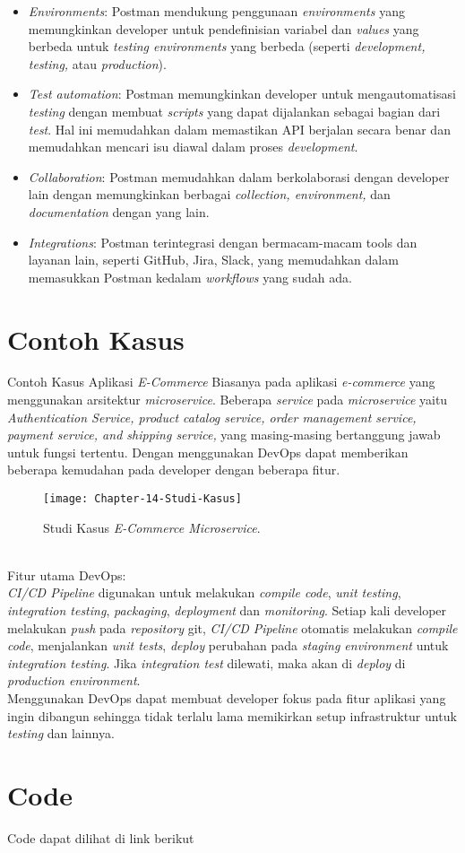 \begin{enumerate}
\begin{itemize}
		\item \textit{Environments}: Postman mendukung penggunaan \textit{environments} yang memungkinkan developer untuk pendefinisian variabel dan \textit{values} yang berbeda untuk \textit{testing environments} yang berbeda (seperti \textit{development, testing,} atau \textit{production}).
		
		\item \textit{Test automation}: Postman memungkinkan developer untuk mengautomatisasi \textit{testing} dengan membuat \textit{scripts} yang dapat dijalankan sebagai bagian dari \textit{test}. Hal ini memudahkan dalam memastikan API berjalan secara benar dan memudahkan mencari isu diawal dalam proses \textit{development}.
		
		\item \textit{Collaboration}: Postman memudahkan dalam berkolaborasi dengan developer lain dengan memungkinkan berbagai \textit{collection, environment,} dan \textit{documentation} dengan yang lain.
		
		\item \textit{Integrations}: Postman terintegrasi dengan bermacam-macam tools dan layanan lain, seperti GitHub, Jira, Slack, yang memudahkan dalam memasukkan Postman kedalam \textit{workflows} yang sudah ada.
	\end{itemize}
\end{enumerate}
\section{Contoh Kasus}
Contoh Kasus Aplikasi \textit{E-Commerce}
Biasanya pada aplikasi \textit{e-commerce} yang menggunakan arsitektur \textit{microservice}. Beberapa \textit{service} pada \textit{microservice} yaitu
\textit{Authentication Service, product catalog service, order management service, payment service, and shipping service,} yang masing-masing bertanggung jawab untuk fungsi tertentu.
Dengan menggunakan DevOps dapat memberikan beberapa kemudahan pada developer dengan beberapa fitur.
\begin{figure}[h]
	\centering
	\texttt{[image: Chapter-14-Studi-Kasus]}
	\caption{Studi Kasus \textit{E-Commerce Microservice}.}
	\label{fig:client-server-schema}
\end{figure}
\\Fitur utama DevOps:
	\\\textit{CI/CD Pipeline} digunakan untuk melakukan \textit{compile code}, \textit{unit testing}, \textit{integration testing}, \textit{packaging}, \textit{deployment} dan \textit{monitoring}.
	Setiap kali developer melakukan \textit{push} pada \textit{repository} git, \textit{CI/CD Pipeline} otomatis melakukan \textit{compile code}, menjalankan \textit{unit tests},
	\textit{deploy} perubahan pada \textit{staging environment} untuk \textit{integration testing}. Jika \textit{integration test} dilewati, maka akan di \textit{deploy} di \textit{production environment}.
	\\Menggunakan DevOps dapat membuat developer fokus pada fitur aplikasi yang ingin dibangun sehingga tidak terlalu lama memikirkan setup infrastruktur untuk \textit{testing} dan lainnya.
\section{Code}
Code dapat dilihat di link berikut
